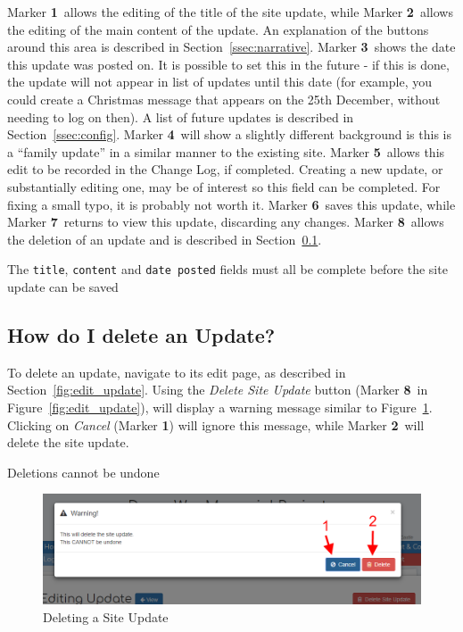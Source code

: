 \documentclass[12pt]{article}
\newcommand{\marker}[1]{Marker \color{red}\textbf{#1}\color{black}}
\begin{document}
\marker{1}\ allows the editing of the title of the site update, while \marker{2}\ allows the editing of the main content of the update. An explanation of the buttons around this area is described in Section~\ref{ssec:narrative}. \marker{3}\ shows the date this update was posted on. It is possible to set this in the future - if this is done, the update will not appear in list of updates until this date (for example, you could create a Christmas message that appears on the 25th December, without needing to log on then). A list of future updates is described in Section~\ref{ssec:config}. \marker{4}\ will show a slightly different background is this is a ``family update'' in a similar manner to the existing site. \marker{5}\ allows this edit to be recorded in the Change Log, if completed. Creating a new update, or substantially editing one, may be of interest so this field can be completed. For fixing a small typo, it is probably not worth it. \marker{6}\ saves this update, while \marker{7}\ returns to view this update, discarding any changes. \marker{8}\ allows the deletion of an update and is described in Section~\ref{ssec:delete_update}.

\begin{infoBox}
The \texttt{title}, \texttt{content} and \texttt{date posted} fields must all be complete before the site update can be saved
\end{infoBox}

\FloatBarrier
\subsection{How do I delete an Update?}\label{ssec:delete_update}
To delete an update, navigate to its edit page, as described in Section~\ref{fig:edit_update}. Using the \textit{Delete Site Update} button (\marker{8}\ in Figure~\ref{fig:edit_update}), will display a warning message similar to Figure~\ref{fig:delete_update}. Clicking on \textit{Cancel} (\marker{1}) will ignore this message, while \marker{2}\ will delete the site update.

\begin{warningBox}
Deletions cannot be undone
\end{warningBox}

\begin{figure}[h]
  \centering
 \includegraphics[width=.9\textwidth]{pics/delete_update.png}
	\caption{Deleting a Site Update}\label{fig:delete_update}
\end{figure}
\end{document}
